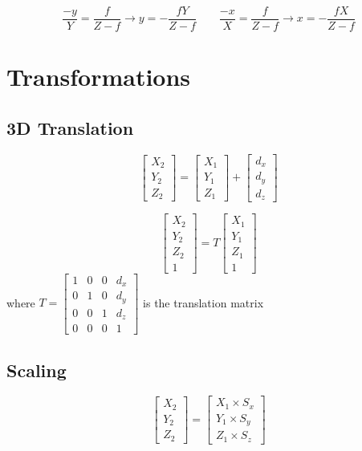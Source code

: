 \documentclass{article}
\begin{document}
\[\frac{-y}{Y}=\frac{f}{Z-f}\rightarrow y=-\frac{fY}{Z-f}\quad\quad \frac{-x}{X}=
\frac{f}{Z-f}\rightarrow x =-\frac{fX}{Z-f}\]

\section*{Transformations}
\subsection*{3D Translation}
\[\begin{bmatrix}
    X_2 \\ Y_2 \\ Z_2
\end{bmatrix} = \begin{bmatrix}
    X_1 \\ Y_1 \\ Z_1
\end{bmatrix} + \begin{bmatrix}
    d_x \\ d_y \\ d_z
\end{bmatrix}\]

\[\begin{bmatrix}
    X_2 \\ Y_2 \\ Z_2 \\ 1
\end{bmatrix} = T \begin{bmatrix}
    X_1 \\ Y_1 \\ Z_1 \\ 1
\end{bmatrix}\] where $T=\begin{bmatrix}
    1 & 0 & 0 & d_x \\
    0 & 1 & 0 & d_y \\
    0 & 0 & 1 & d_z \\
    0 & 0 & 0 & 1
\end{bmatrix}$ is the translation matrix

\pagebreak

\subsection*{Scaling}
\[\begin{bmatrix}
    X_2 \\ Y_2 \\ Z_2
\end{bmatrix} = \begin{bmatrix}
    X_1 \times S_x \\ Y_1 \times S_y \\ Z_1 \times S_z
\end{bmatrix}\]
\end{document}
